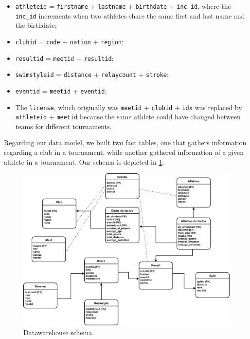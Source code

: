 \documentclass[a4paper, 11pt]{article}
\begin{document}
\begin{itemize}
    \item \texttt{athleteid} = \texttt{firstname} + \texttt{lastname} + \texttt{birthdate} + \texttt{inc\_id}, where the \texttt{inc\_id} increments when two athletes share the same first and last name and the birthdate;
    \item \texttt{clubid} = \texttt{code} + \texttt{nation} + \texttt{region};
    \item \texttt{resultid} = \texttt{meetid} + \texttt{resultid};
    \item \texttt{swimstyleid} = \texttt{distance} + \texttt{relaycount} + \texttt{stroke};
    \item \texttt{eventid} = \texttt{meetid} + \texttt{eventid};
    \item The \texttt{license}, which originally was \texttt{meetid} + \texttt{clubid} + \texttt{idx} was replaced by \texttt{athleteid} + \texttt{meetid} because the same athlete could have changed between teams for different tournaments.
\end{itemize}

Regarding our data model, we built two fact tables, one that gathers information regarding a club in a tournament, while another gathered information of a given athlete in a tournament. Our schema is depicted in \cref{fig:defact}. 

\begin{figure}[ht]
    \centering
    \includegraphics[width=\textwidth]{img/datawarehouse.pdf}
    \caption{Datawarehouse schema.}
    \label{fig:defact}
\end{figure}
\end{document}
